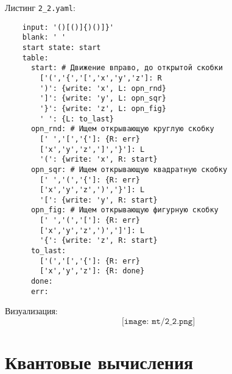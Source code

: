 \documentclass[a4paper, 12pt] {article} %
\begin{document}
\begin{enumerate}
    Листинг \texttt{2_2.yaml}:
    \begin{verbatim}
    input: '()[()]{)()]}'
    blank: ' '
    start state: start
    table:
      start: # Движение вправо, до открытой скобки
        ['(','{','[','x','y','z']: R
        ')': {write: 'x', L: opn_rnd}
        ']': {write: 'y', L: opn_sqr}
        '}': {write: 'z', L: opn_fig}
        ' ': {L: to_last}
      opn_rnd: # Ищем открывающую круглую скобку
        [' ','[','{']: {R: err} 
        ['x','y','z',']','}']: L
        '(': {write: 'x', R: start}
      opn_sqr: # Ищем открывающую квадратную скобку
        [' ','(','{']: {R: err} 
        ['x','y','z',')','}']: L
        '[': {write: 'y', R: start}
      opn_fig: # Ищем открывающую фигурную скобку
        [' ','(','[']: {R: err} 
        ['x','y','z',')',']']: L
        '{': {write: 'z', R: start}
      to_last:
        ['(','[','{']: {R: err}
        ['x','y','z']: {R: done}
      done:
      err:
    \end{verbatim}
    
    Визуализация:
    \[\texttt{[image: mt/2\_2.png]}\]
\end{enumerate}


\section{Квантовые вычисления}
\end{document}
